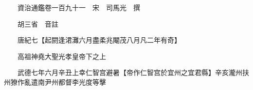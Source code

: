 










 


 
 


 

  
  
  
  
  





  
  
  
  
  
 
  

  

  
  
  



  

 
 

  
   




  

  
  


  　　資治通鑑卷一百九十一　宋　司馬光　撰

　　胡三省　音註

　　唐紀七【起閼逢涒灘六月盡柔兆閹茂八月凡二年有奇】

　　高祖神堯大聖光孝皇帝下之上

　　武德七年六月辛丑上幸仁智宫避暑【帝作仁智宫於宜州之宜君縣】辛亥瀧州扶州獠作亂遣南尹州都督李光度等擊

